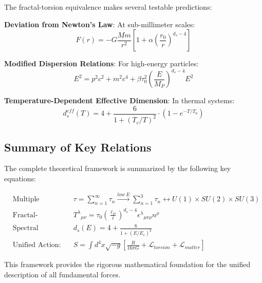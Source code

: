 The fractal-torsion equivalence makes several testable predictions:

\textbf{Deviation from Newton's Law}: At sub-millimeter scales:
\begin{equation}
    F(r) = -G\frac{Mm}{r^2}\left[1 + \alpha\left(\frac{r_0}{r}\right)^{d_s - 4}\right]
\end{equation}

\textbf{Modified Dispersion Relations}: For high-energy particles:
\begin{equation}
    E^2 = p^2c^2 + m^2c^4 + \beta \tau_0^2 \left(\frac{E}{M_P}\right)^{d_s - 4} E^2
\end{equation}

\textbf{Temperature-Dependent Effective Dimension}: In thermal systems:
\begin{equation}
    d_s^{eff}(T) = 4 + \frac{6}{1 + (T_c/T)^2} \cdot \left(1 - e^{-T/T_0}\right)
\end{equation}

\subsection{Summary of Key Relations}

The complete theoretical framework is summarized by the following key equations:

\begin{align}
    &\text{Multiple Twisting:} && \tau = \sum_{n=1}^{\infty} \tau_n \xrightarrow{low\ E} \sum_{n=1}^{3} \tau_n \leftrightarrow U(1) \times SU(2) \times SU(3) \\[1em]
    &\text{Fractal-Torsion:} && T^{\lambda}{}_{\mu\nu} = \tau_0 \left(\frac{\ell_P}{\ell}\right)^{d_s - 4} \epsilon^{\lambda}{}_{\mu\nu\rho} n^{\rho} \\[1em]
    &\text{Spectral Dimension:} && d_s(E) = 4 + \frac{6}{1 + (E/E_c)^2} \\[1em]
    &\text{Unified Action:} && S = \int d^4x \sqrt{-g} \left[\frac{R}{16\pi G} + \mathcal{L}_{torsion} + \mathcal{L}_{matter}\right]
\end{align}

This framework provides the rigorous mathematical foundation for the unified description of all fundamental forces.
